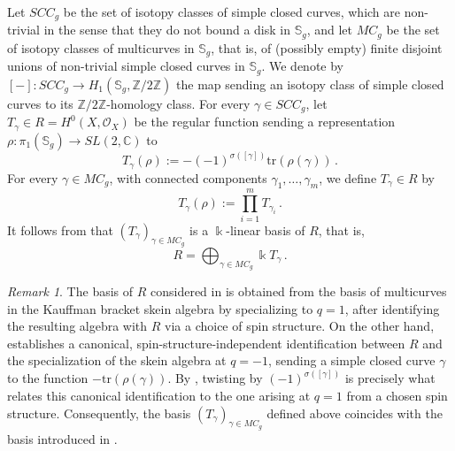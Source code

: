 \documentclass[12pt,letterpaper, reqno]{amsart}
\theoremstyle{defstyle} \newtheorem{definition}[theorem]{Definition}
\theoremstyle{remark}
\newtheorem{remark}[theorem]{Remark}
\numberwithin{equation}{section}
\numberwithin{figure}{section}
\newcommand{\kk} {\Bbbk}
\newcommand{\CC} {\mathbb{C}}
\newcommand{\bS} {\mathbb{S}}
\newcommand{\cO} {\mathcal{O}}
\newcommand{\ZZ} {\mathbb{Z}}
\begin{document}
Let $SCC_g$ be the set of isotopy classes of simple closed curves, which are non-trivial in the sense that they do not bound a disk in $\bS_g$, and let $MC_g$ be the set of isotopy classes of multicurves in $\bS_g$, that is, of (possibly empty) finite disjoint unions of non-trivial simple closed curves in $\bS_g$. 
We denote by $[-]: SCC_g \rightarrow H_1(\bS_g, \ZZ/2\ZZ)$ the map sending an isotopy class of simple closed curves to its $\ZZ/2\ZZ$-homology class.
For every $\gamma \in SCC_g$, let $T_\gamma \in R=H^0(X,\cO_X)$ be the regular function sending a representation $\rho: \pi_1(\bS_g) \rightarrow SL(2,\CC)$ to 
\begin{equation}
\label{eq_spin}
T_{\gamma}(\rho):=  - (-1)^{\sigma([\gamma])} \mathrm{tr}(\rho(\gamma)) \,.\end{equation}
For every $\gamma \in MC_g$, with connected components $\gamma_1, \dots, \gamma_m$, we define $T_\gamma \in R$ by 
\begin{equation} 
\label{eq_T_gamma}
T_\gamma(\rho):= \prod_{i=1}^m T_{\gamma_i} \,.\end{equation}
It follows from \cite{Charles2012multicurves} that  $(T_\gamma)_{\gamma \in MC_g}$ is a $\kk$-linear basis of $R$, that is, 
\begin{equation} \label{eq_R_basis}
R = \bigoplus_{\gamma \in MC_g} \kk T_\gamma \,.\end{equation}
\begin{remark}
The basis of $R$ considered in \cite{ayilliath2025geometric} is obtained from the basis of multicurves in the Kauffman bracket skein algebra by specializing to \(q=1\), after identifying the resulting algebra with \(R\) via a choice of spin structure. On the other hand, \cite{Charles2012multicurves} establishes a canonical, spin-structure-independent identification between \(R\) and the specialization of the skein algebra at \(q=-1\), sending a simple closed curve \(\gamma\) to the function \(-\mathrm{tr}(\rho(\gamma))\). By \cite{barrett1999skein}, twisting by \((-1)^{\sigma([\gamma])}\) is precisely what relates this canonical identification to the one arising at \(q=1\) from a chosen spin structure. Consequently, the basis \((T_\gamma)_{\gamma \in MC_g}\) defined above coincides with the basis introduced in \cite{ayilliath2025geometric}.
\end{remark}
\end{document}
